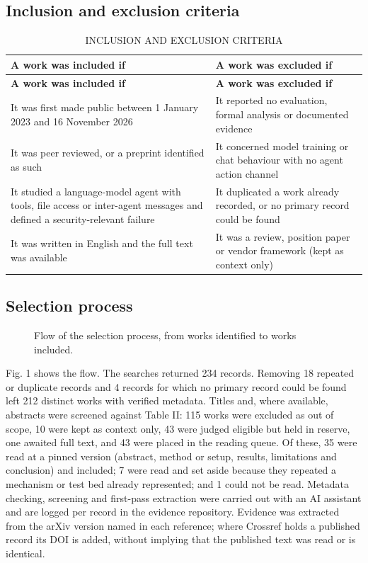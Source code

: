 \subsection{Inclusion and exclusion criteria}
\begingroup
\fontsize{9}{10.5}\selectfont
\setlength{\tabcolsep}{1.4mm}
\renewcommand{\arraystretch}{1.08}
\begin{longtable}{|>{\raggedright\arraybackslash}p{81.98mm}|>{\raggedright\arraybackslash}p{81.98mm}|}
\caption{INCLUSION AND EXCLUSION CRITERIA}\\
\hline
\rowcolor{navy}\color{white}\bfseries A work was included if & \color{white}\bfseries A work was excluded if\\\hline
\endfirsthead
\hline
\rowcolor{navy}\color{white}\bfseries A work was included if & \color{white}\bfseries A work was excluded if\\\hline
\endhead
\endfoot
\endlastfoot
It was first made public between 1 January 2023 and 16 November 2026 & It reported no evaluation, formal analysis or documented evidence\\\hline
It was peer reviewed, or a preprint identified as such & It concerned model training or chat behaviour with no agent action channel\\\hline
It studied a language-model agent with tools, file access or inter-agent messages and defined a security-relevant failure & It duplicated a work already recorded, or no primary record could be found\\\hline
It was written in English and the full text was available & It was a review, position paper or vendor framework (kept as context only)\\\hline
\end{longtable}
\endgroup

\subsection{Selection process}
\begin{figure}[htbp]\centering

\caption{Flow of the selection process, from works identified to works included.}
\end{figure}
Fig. 1 shows the flow. The searches returned 234 records. Removing 18 repeated or duplicate records and 4 records for which no primary record could be found left 212 distinct works with verified metadata. Titles and, where available, abstracts were screened against Table II: 115 works were excluded as out of scope, 10 were kept as context only, 43 were judged eligible but held in reserve, one awaited full text, and 43 were placed in the reading queue. Of these, 35 were read at a pinned version (abstract, method or setup, results, limitations and conclusion) and included; 7 were read and set aside because they repeated a mechanism or test bed already represented; and 1 could not be read. Metadata checking, screening and first-pass extraction were carried out with an AI assistant and are logged per record in the evidence repository. Evidence was extracted from the arXiv version named in each reference; where Crossref holds a published record its DOI is added, without implying that the published text was read or is identical.

